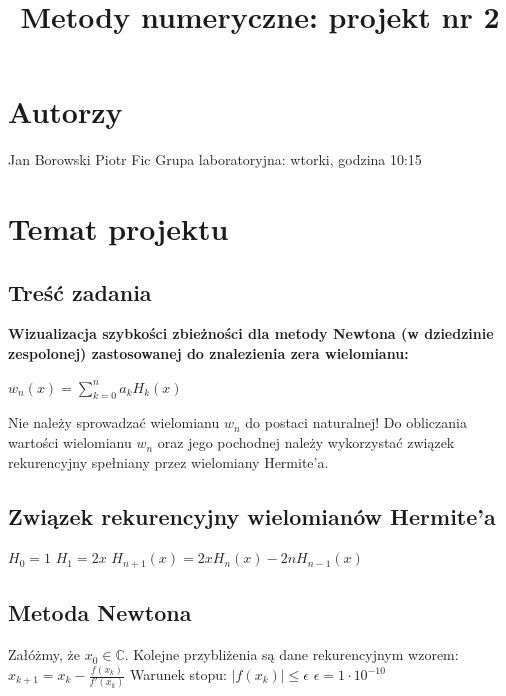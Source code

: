 \documentclass[10pt]{article}   %
\begin{document}
\title{Metody numeryczne: projekt nr 2}
\maketitle

\tableofcontents

\section{Autorzy}
Jan Borowski\newline
Piotr Fic\newline
Grupa laboratoryjna: wtorki, godzina 10:15
\newpage
\section{Temat projektu}

\subsection{Treść zadania}

\textbf{Wizualizacja szybkości zbieżności dla metody Newtona
(w dziedzinie zespolonej) zastosowanej do znalezienia zera wielomianu:}\newline
\begin{center}

$w_{n}(x)={\sum}_{k=0}^{n}a_{k}H_{k}(x)$

\end{center}

Nie należy sprowadzać wielomianu $w_{n}$ do postaci naturalnej! Do obliczania wartości wielomianu $w_{n}$ oraz jego pochodnej należy wykorzystać związek rekurencyjny spełniany przez wielomiany Hermite'a.

\subsection{Związek rekurencyjny wielomianów Hermite'a}

$H_{0}=1$\newline
$H_{1}=2x$\newline
$H_{n+1}(x)=2xH_{n}(x)-2nH_{n-1}(x)$

\subsection{Metoda Newtona}
Załóżmy, że $x_{0} \in\mathbb{C}$.
Kolejne przybliżenia są dane rekurencyjnym wzorem:
\newline
\newline
$x_{k+1}=x_{k}-\frac{f(x_{k})}{f'(x_{k})}$
\newline
\newline
Warunek stopu:
\newline
$|f(x_{k})| \leqslant \epsilon$
\newline
$\epsilon = 1 \cdot 10^{-10}$
\end{document}
